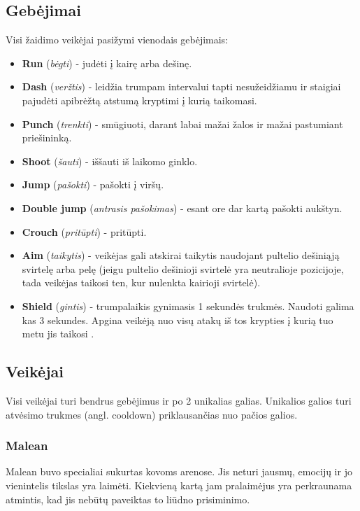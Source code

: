 \documentclass{VUMIFPSkursinis}
\begin{document}

\subsection{Gebėjimai}
Visi žaidimo veikėjai pasižymi vienodais gebėjimais:
\begin{itemize}
    \item \textbf{Run} (\textit{bėgti}) - judėti į kairę arba dešinę.
    \item \textbf{Dash} (\textit{veržtis}) - leidžia trumpam intervalui tapti nesužeidžiamu ir staigiai pajudėti apibrėžtą atstumą kryptimi į kurią taikomasi.
    \item \textbf{Punch} (\textit{trenkti}) - smūgiuoti, darant labai mažai žalos ir mažai pastumiant priešininką.
    \item \textbf{Shoot} (\textit{šauti}) - iššauti iš laikomo ginklo.
    \item \textbf{Jump} (\textit{pašokti}) - pašokti į viršų.
    \item \textbf{Double jump} (\textit{antrasis pašokimas}) - esant ore dar kartą pašokti aukštyn.
    \item \textbf{Crouch} (\textit{pritūpti}) - pritūpti.
    \item \textbf{Aim} (\textit{taikytis}) - veikėjas gali atskirai taikytis naudojant pultelio dešiniąją svirtelę arba pelę (jeigu pultelio dešinioji svirtelė yra neutralioje pozicijoje, tada veikėjas taikosi ten, kur nulenkta kairioji svirtelė).
    \item \textbf{Shield} (\textit{gintis}) - trumpalaikis gynimasis 1 sekundės trukmės. Naudoti galima kas 3 sekundes. Apgina veikėją nuo visų atakų iš tos krypties į kurią tuo metu jis taikosi    .
\end{itemize}


\subsection{Veikėjai}
Visi veikėjai turi bendrus gebėjimus ir po 2 unikalias galias. Unikalios galios turi atvėsimo trukmes (angl. cooldown) priklausančias nuo pačios galios.


\subsubsection{Malean}
Malean buvo specialiai sukurtas kovoms arenose. Jis neturi jausmų, emocijų ir jo vienintelis tikslas yra laimėti. Kiekvieną kartą jam pralaimėjus yra perkraunama atmintis, kad jis nebūtų paveiktas to liūdno prisiminimo.
\end{document}
